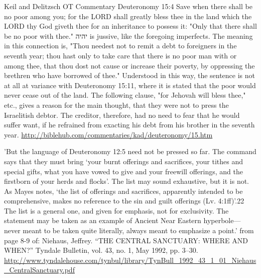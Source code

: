 \documentclass[11pt]{article}
\begin{document}
\begin{thebibliography}{37}
Keil and Delitzsch OT Commentary
Deuteronomy 15:4
Save when there shall be no poor among you; for the LORD shall greatly bless thee in the land which the LORD thy God giveth thee for an inheritance to possess it:
"Only that there shall be no poor with thee." יהיה is jussive, like the foregoing imperfects. The meaning in this connection is, "Thou needest not to remit a debt to foreigners in the seventh year; thou hast only to take care that there is no poor man with or among thee, that thou dost not cause or increase their poverty, by oppressing the brethren who have borrowed of thee." Understood in this way, the sentence is not at all at variance with Deuteronomy 15:11, where it is stated that the poor would never cease out of the land. The following clause, "for Jehovah will bless thee," etc., gives a reason for the main thought, that they were not to press the Israelitish debtor. The creditor, therefore, had no need to fear that he would suffer want, if he refrained from exacting his debt from his brother in the seventh year. 
\url{http://biblehub.com/commentaries/kad/deuteronomy/15.htm}

'But the language
of Deuteronomy 12:5 need not be pressed so far. The command says
that they must bring ‘your burnt offerings and sacrifices, your tithes
and special gifts, what you have vowed to give and your freewill
offerings, and the firstborn of your herds and flocks’. The list may
sound exhaustive, but it is not. As Mayes notes, ‘the list of offerings
and sacrifices, apparently intended to be comprehensive, makes no
reference to the sin and guilt offerings (Lv. 4:1ff)’.22 The list is a general one, and given for emphasis, not for exclusivity. The
statement may be taken as an example of Ancient Near Eastern
hyperbole—never meant to be taken quite literally, always meant to
emphasize a point.' from page 8-9 of: \newline
Niehaus, Jeffrey. “THE CENTRAL SANCTUARY: WHERE AND WHEN?” Tyndale Bulletin, vol. 43, no. 1, May 1992, pp. 3–30.
\url{http://www.tyndalehouse.com/tynbul/library/TynBull_1992_43_1_01_Niehaus_CentralSanctuary.pdf}


\end{thebibliography}
\end{document}
